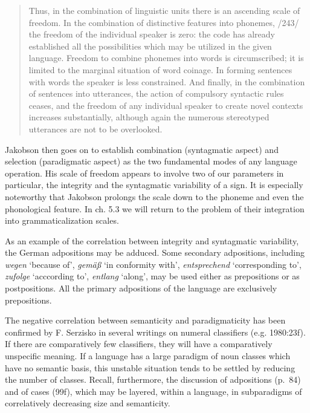 \begin{quote}
Thus, in the combination of linguistic units there is an ascending scale of freedom. In the combination of distinctive features into phonemes, /243/ the freedom of the individual speaker is zero: the code has already established all the possibilities which may be utilized in the given language. Freedom to combine phonemes into words is circumscribed; it is limited to the marginal situation of word coinage. In forming sentences with words the speaker is less constrained. And finally, in the combination of sentences into utterances, the action of compulsory syntactic rules ceases, and the freedom of any individual speaker to create novel contexts increases substantially, although again the numerous stereotyped utterances are not to be overlooked.
\end{quote}

Jakobson then goes on to establish combination (syntagmatic aspect) and selection (paradigmatic aspect) as the two fundamental modes of any language operation. His scale of freedom appears to involve two of our parameters in particular, the integrity and the syntagmatic variability of a sign. It is especially noteworthy that Jakobson prolongs the scale down to the phoneme and even the phonological feature. In ch. 5.3 we will return to the problem of their integration into grammaticalization scales.

As an example of the correlation between integrity and syntagmatic variability, the German adpositions may be adduced. Some secondary adpositions, including \textit{wegen} ‘because of’, \textit{gemäß} ‘in conformity with’, \textit{entsprechend} ‘corresponding to’, \textit{zufolge} ‘acccording to’, \textit{entlang} ‘along’, may be used either as prepositions or as postpositions. All the primary adpositions of the language are exclusively prepositions.

The negative correlation between semanticity and paradigmaticity has been confirmed by F. Serzisko in several writings on numeral classifiers (e.g. 1980:23f). If there are comparatively few classifiers, they will have a comparatively unspecific meaning. If a language has a large paradigm of noun classes which have no semantic basis, this unstable situation tends to be settled by reducing the number of classes. Recall, furthermore, the discussion of adpositions (p.~84) and of cases (99f), which may be layered, within a language, in subparadigms of correlatively decreasing size and semanticity.

